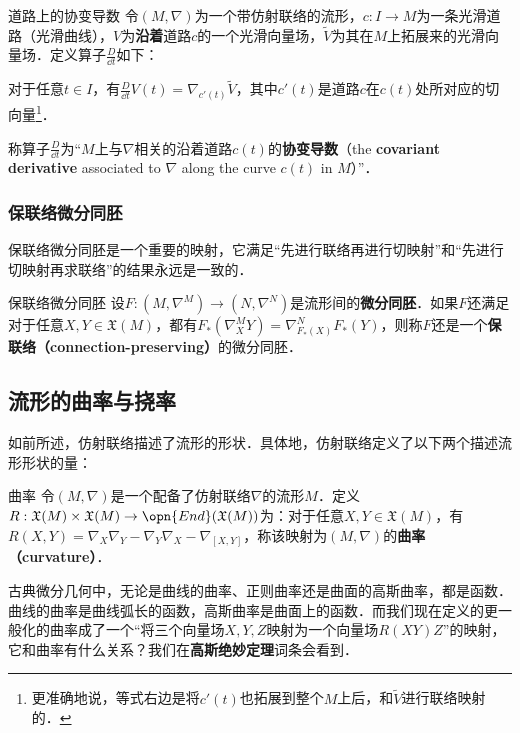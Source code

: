\begin{definition}{道路上的协变导数}
令$(M, \nabla)$为一个带仿射联络的流形，$c:I\to M$为一条光滑道路（光滑曲线），$V$为\textbf{沿着}道路$c$的一个光滑向量场，$\tilde{V}$为其在$M$上拓展来的光滑向量场．定义算子$\frac{D}{\dd t}$如下：

对于任意$t\in I$，有$\frac{D}{\dd t}V(t)=\nabla_{c'(t)}\tilde{V}$，其中$c'(t)$是道路$c$在$c(t)$处所对应的切向量\footnote{更准确地说，等式右边是将$c'(t)$也拓展到整个$M$上后，和$\tilde{V}$进行联络映射的．}．

称算子$\frac{D}{\dd t}$为“$M$上与$\nabla$相关的沿着道路$c(t)$的\textbf{协变导数}（the \textbf{covariant derivative} associated to $\nabla$ along the curve $c(t)$ in $M$）”．
\end{definition}





\subsubsection{保联络微分同胚}

保联络微分同胚是一个重要的映射，它满足“先进行联络再进行切映射”和“先进行切映射再求联络”的结果永远是一致的．

\begin{definition}{保联络微分同胚}
设$F:(M, \nabla^M)\to (N, \nabla^N)$是流形间的\textbf{微分同胚}．如果$F$还满足对于任意$X, Y\in \mathfrak{X}(M)$，都有$F_*(\nabla^M_XY)=\nabla^N_{F_*(X)}F_*(Y)$，则称$F$还是一个\textbf{保联络（connection-preserving）}的微分同胚．
\end{definition}




\subsection{流形的曲率与挠率}

如前所述，仿射联络描述了流形的形状．具体地，仿射联络定义了以下两个描述流形形状的量：

\begin{definition}{曲率}
令$(M, \nabla)$是一个配备了仿射联络$\nabla$的流形$M$．定义$R:\mathfrak{X}(M)\times\mathfrak{X}(M)\to\opn{End}(\mathfrak{X}(M))$为：对于任意$X, Y\in\mathfrak{X}(M)$，有$R(X, Y)=\nabla_X\nabla_Y-\nabla_Y\nabla_X-\nabla_{[X, Y]}$，称该映射为$(M, \nabla)$的\textbf{曲率（curvature）}．
\end{definition}

古典微分几何中，无论是曲线的曲率、正则曲率还是曲面的高斯曲率，都是函数．曲线的曲率是曲线弧长的函数，高斯曲率是曲面上的函数．而我们现在定义的更一般化的曲率成了一个“将三个向量场$X, Y, Z$映射为一个向量场$R(XY)Z$”的映射，它和曲率有什么关系？我们在\textbf{高斯绝妙定理}词条会看到．

